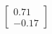 \documentclass[preview]{standalone}
\begin{document}
\begin{align*}
\begin{bmatrix} 0.71 \\ -0.17 \end{bmatrix}
\end{align*}
\end{document}

